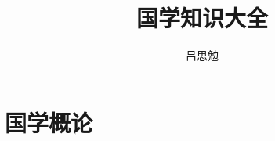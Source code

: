 \documentclass[a4paper, twocolumn, AutoFakeBold]{cvertbook} %
\begin{document}
\title{国学知识大全} %
\author{吕思勉}

\tableofcontents

\inmain %
\part{国学概论}

\end{document}
